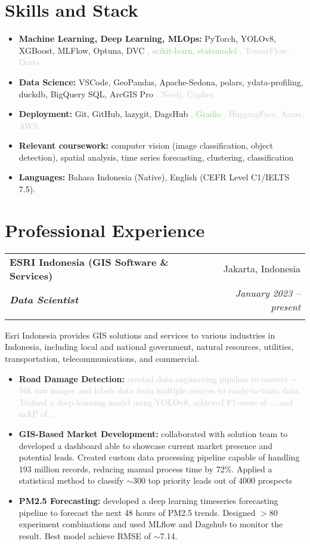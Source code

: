 \documentclass[a4paper, 11pt]{article}
\makeatletter
\newcommand{\resumeItem}[2]{
    \item\small{
        \textbf{#1}{#2 \vspace{-2pt}}
    }
}
\newcommand{\resumeSubheading}[4]{
    \vspace{-1pt}
    \begin{tabular*}{\textwidth}{l@{\extracolsep{\fill}}r}
        \color{lightblue}\textbf{#1} & #2 \\
        \textbf{\textit{\small#3}} & \textit{\small #4} \\
        \textnormal{}\vspace{-5pt}
    \end{tabular*}\vspace{-5pt}
}
\newcommand{\resumeItemListStart}{\begin{itemize}[leftmargin=*]\setlength\itemsep{0em}\vspace{-1pt}}
\newcommand{\resumeItemListEnd}{\end{itemize}\vspace{-5pt}}
\makeatother
\begin{document}
    \section{Skills and Stack}
    \resumeItemListStart
    \resumeItem{Machine Learning, Deep Learning, MLOps:}{
        PyTorch, YOLOv8, XGBoost, MLFlow, Optuna, DVC
        \textcolor[HTML]{8bd274}{, scikit-learn, statsmodel} %
        \textcolor[HTML]{C8cfd4}{, TensorFlow, Darts} %
    }
    \resumeItem{Data Science:}{
        VSCode, GeoPandas, Apache-Sedona, polars, ydata-profiling,
        duckdb, BigQuery SQL, ArcGIS Pro
        \textcolor[HTML]{C8cfd4}{, Neo4j, Cypher}
    }
    \resumeItem{Deployment:}{
        Git, GitHub, lazygit, DagsHub
        \textcolor[HTML]{8bd274}{, Gradio}
        \textcolor[HTML]{C8cfd4}{, HuggingFace, Azure, AWS}
    }
    \resumeItem{Relevant coursework:}{
        computer vision (image classification, object detection),
        spatial analysis,
        time series forecasting,
        clustering,
        classification
    }
    \resumeItem{Languages:}{
        Bahasa Indonesia (Native), 
        English (CEFR Level C1/IELTS 7.5).
    }
    \resumeItemListEnd
	
    \vspace{-5pt}
    \section{Professional Experience}
    \resumeSubheading
    {ESRI Indonesia (GIS Software \& Services)}{Jakarta, Indonesia}
    {Data Scientist}{January 2023 – present}
    \small{Esri Indonesia provides GIS solutions and services to various industries in 
    Indonesia, including local and national government, natural resources, utilities, 
    transportation, telecommunications, and commercial.}
    \vspace{-1pt}
    \resumeItemListStart
    \resumeItem{Road Damage Detection:}{ \textcolor[HTML]{C8cfd4}{created data engineering pipeline to convert
    $\sim$16k raw images and labels data from multiple sources to ready-to-train data. Trained
    a deep learning model using YOLOv8, achieved F1-score of ... and mAP of ...}}
    \resumeItem{GIS-Based Market Development:}{ collaborated with solution team to 
    developed a dashboard able to showcase current market presence and potential leads. 
    Created custom data processing pipeline capable of handling 193 million records, 
    reducing manual process time by 72\%. Applied a statistical method to classify 
    $\sim$300 top priority leads out of 4000 prospects
    }
    \resumeItem{PM2.5 Forecasting:}{ developed a deep learning 
    timeseries forecasting pipeline to forecast the next 48 hours of PM2.5 trends. 
    Designed $>$80 experiment combinations and used MLflow and Dagshub to monitor the 
    result. Best model achieve RMSE of $\sim$7.14.
    }
    \resumeItemListEnd
\end{document}
